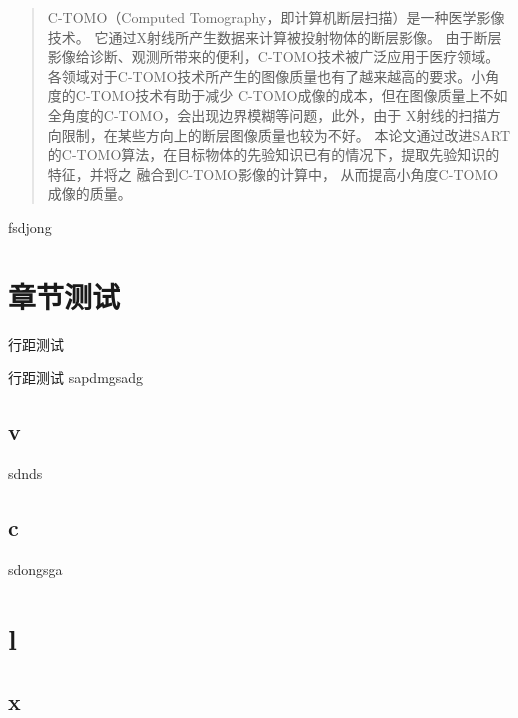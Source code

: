 



\frontmatter
\begin{abstract}
\kaishu{}
C-TOMO（Computed Tomography，即计算机断层扫描）是一种医学影像技术。
它通过X射线所产生数据来计算被投射物体的断层影像。
由于断层影像给诊断、观测所带来的便利，C-TOMO技术被广泛应用于医疗领域。
各领域对于C-TOMO技术所产生的图像质量也有了越来越高的要求。小角度的C-TOMO技术有助于减少
C-TOMO成像的成本，但在图像质量上不如全角度的C-TOMO，会出现边界模糊等问题，此外，由于
X射线的扫描方向限制，在某些方向上的断层图像质量也较为不好。
本论文通过改进SART的C-TOMO算法，在目标物体的先验知识已有的情况下，提取先验知识的特征，并将之
融合到C-TOMO影像的计算中，
从而提高小角度C-TOMO成像的质量。

\end{abstract}

\begin{englishabstract}
 fsdjong

\end{englishabstract}
\NJUTtableofcontents
\mainmatter
\chapter{章节测试}
行距测试

行距测试
\cite{Al-Osh1987} \cite{Xu2007}
sapdmgsadg
\section{v}
sdnds
\section{c}
sdongsga
\chapter{l}
\section{x}






